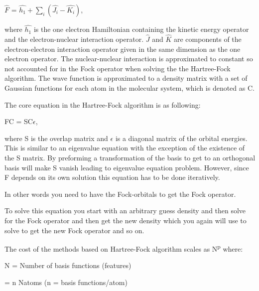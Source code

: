 \documentclass[twoside]{article}
\begin{document}
$\hat{F}$ = $\hat{h_1} + \sum\limits_{i}(\hat{J_i} - \hat{K_i})$,

where $\hat{h_1}$ is the one electron Hamiltonian containing the kinetic energy operator and the electron-nuclear interaction operator. $\hat{J}$ and $\hat{K}$ are components of the electron-electron interaction operator given in the same dimension as the one electron operator. The nuclear-nuclear interaction is approximated to constant so not accounted for in the Fock operator when solving 
the the Hartree-Fock algorithm. The wave function is approximated to a density matrix with a set of Gaussian functions for each atom in the molecular system, which is denoted as C. 


The core equation in the Hartree-Fock algorithm is as following:


% 
% 


FC = SC$\epsilon$,

where S is the overlap matrix and $\epsilon$ is a diagonal matrix of the orbital energies. This is similar to an eigenvalue equation with the exception of the existence of the S matrix. By preforming a transformation of the basis to get to an orthogonal basis will make S vanish leading to eigenvalue equation problem. However, since F depends on its own solution this equation has to be done iteratively. 

In other words you need to have the Fock-orbitals to get the Fock operator. 

To solve this equation you start with an arbitrary guess density and then solve for the Fock operator and then get the new density which you again will use to solve to get the new Fock operator and so on. 

The cost of the methods based on Hartree-Fock algorithm scales as N\textsuperscript{p} where: 

N = Number of basis functions (features) 

= n Natoms  (n = basis functions/atom)  
\end{document}
